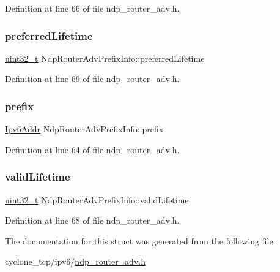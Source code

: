 Definition at line 66 of file ndp\+\_\+router\+\_\+adv.\+h.

\mbox{\label{structNdpRouterAdvPrefixInfo_ad24e693aee55a8f655925fd66e7824d6}} 
\subsubsection{\texorpdfstring{preferred\+Lifetime}{preferredLifetime}}
{\footnotesize\ttfamily \hyperlink{stdint_8h_a435d1572bf3f880d55459d9805097f62}{uint32\+\_\+t} Ndp\+Router\+Adv\+Prefix\+Info\+::preferred\+Lifetime}



Definition at line 69 of file ndp\+\_\+router\+\_\+adv.\+h.

\mbox{\label{structNdpRouterAdvPrefixInfo_a31c0170d8af31c480eb758e417b9785c}} 
\subsubsection{\texorpdfstring{prefix}{prefix}}
{\footnotesize\ttfamily \hyperlink{ipv6_8h_aed0cbc40c61ed5b4fb681ebc55237e89}{Ipv6\+Addr} Ndp\+Router\+Adv\+Prefix\+Info\+::prefix}



Definition at line 64 of file ndp\+\_\+router\+\_\+adv.\+h.

\mbox{\label{structNdpRouterAdvPrefixInfo_a02104493db9c0cc0a4340e4e2b222639}} 
\subsubsection{\texorpdfstring{valid\+Lifetime}{validLifetime}}
{\footnotesize\ttfamily \hyperlink{stdint_8h_a435d1572bf3f880d55459d9805097f62}{uint32\+\_\+t} Ndp\+Router\+Adv\+Prefix\+Info\+::valid\+Lifetime}



Definition at line 68 of file ndp\+\_\+router\+\_\+adv.\+h.



The documentation for this struct was generated from the following file\+:\begin{DoxyCompactItemize}
\item 
cyclone\+\_\+tcp/ipv6/\hyperlink{ndp__router__adv_8h}{ndp\+\_\+router\+\_\+adv.\+h}\end{DoxyCompactItemize}

